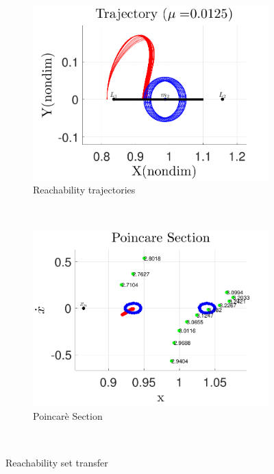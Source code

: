 \documentclass[preprint]{elsarticle}
\begin{document}
\begin{figure} 
	\centering 
	\begin{subfigure}[htbp]{0.5\textwidth} 
		\includegraphics[width=\textwidth]{reach_trajectory} 
		\caption{Reachability trajectories} \label{fig:reach_trajectory} 
	\end{subfigure}~ %
	\begin{subfigure}[htbp]{0.5\textwidth} 
		\includegraphics[width=\textwidth]{poincare_compare} 
		\caption{Poincar\`e Section} \label{fig:poincare_compare} 
	\end{subfigure} ~ %
	\caption{Reachability set transfer}
	\label{fig:reachability_set_transfer} 
\end{figure}
\end{document}
